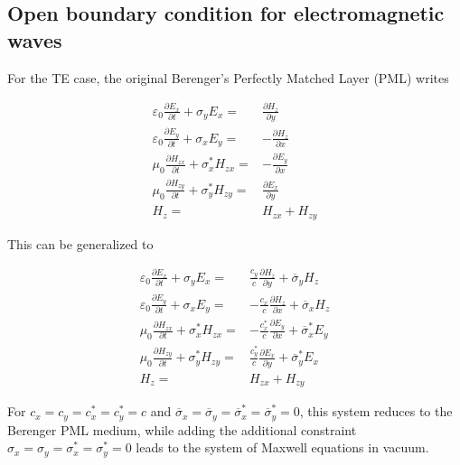 

\subsection{Open boundary condition for electromagnetic waves}

For the TE case, the original Berenger's Perfectly Matched Layer (PML) writes

\begin{eqnarray}
\varepsilon _{0}\frac{\partial E_{x}}{\partial t}+\sigma _{y}E_{x} = & \frac{\partial H_{z}}{\partial y}\label{PML_def_1} \\
\varepsilon _{0}\frac{\partial E_{y}}{\partial t}+\sigma _{x}E_{y} = & -\frac{\partial H_{z}}{\partial x}\label{PML_def_2} \\
\mu _{0}\frac{\partial H_{zx}}{\partial t}+\sigma ^{*}_{x}H_{zx} = & -\frac{\partial E_{y}}{\partial x}\label{PML_def_3} \\
\mu _{0}\frac{\partial H_{zy}}{\partial t}+\sigma ^{*}_{y}H_{zy} = & \frac{\partial E_{x}}{\partial y}\label{PML_def_4} \\
H_{z}  = & H_{zx}+H_{zy}\label{PML_def_5} 
\end{eqnarray}

This can be generalized to

\begin{eqnarray}
\varepsilon _{0}\frac{\partial E_{x}}{\partial t}+\sigma _{y}E_{x} = & \frac{c_{y}}{c}\frac{\partial H_{z}}{\partial y}+\overline{\sigma }_{y}H_{z}\label{APML_def_1} \\
\varepsilon _{0}\frac{\partial E_{y}}{\partial t}+\sigma _{x}E_{y} = & -\frac{c_{x}}{c}\frac{\partial H_{z}}{\partial x}+\overline{\sigma }_{x}H_{z}\label{APML_def_2} \\
\mu _{0}\frac{\partial H_{zx}}{\partial t}+\sigma ^{*}_{x}H_{zx} = & -\frac{c^{*}_{x}}{c}\frac{\partial E_{y}}{\partial x}+\overline{\sigma }_{x}^{*}E_{y}\label{APML_def_3} \\
\mu _{0}\frac{\partial H_{zy}}{\partial t}+\sigma ^{*}_{y}H_{zy} = & \frac{c^{*}_{y}}{c}\frac{\partial E_{x}}{\partial y}+\overline{\sigma }_{y}^{*}E_{x}\label{APML_def_4} \\
H_{z} = & H_{zx}+H_{zy}\label{APML_def_5} 
\end{eqnarray}

For $c_{x}=c_{y}=c^{*}_{x}=c^{*}_{y}=c$ and $\overline{\sigma }_{x}=\overline{\sigma }_{y}=\overline{\sigma }_{x}^{*}=\overline{\sigma }_{y}^{*}=0$,
this system reduces to the Berenger PML medium, while adding the additional
constraint $\sigma _{x}=\sigma _{y}=\sigma _{x}^{*}=\sigma _{y}^{*}=0$
leads to the system of Maxwell equations in vacuum.

